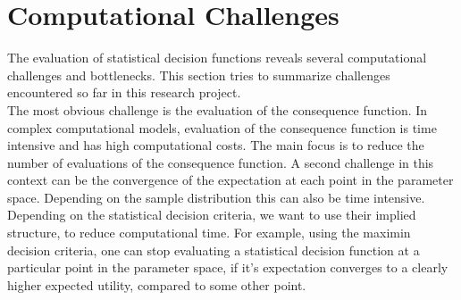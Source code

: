 \section{Computational Challenges}
The evaluation of statistical decision functions reveals several computational challenges and bottlenecks. This section tries to summarize challenges encountered so far in this research project.\\

The most obvious challenge is the evaluation of the consequence function. In complex computational models, evaluation of the consequence function is time intensive and has high computational costs. The main focus is to reduce the number of evaluations of the consequence function. A second challenge in this context can be the convergence of the expectation at each point in the parameter space. Depending on the sample distribution this can also be time intensive.\\

Depending on the statistical decision criteria, we want to use their implied structure, to reduce computational time. For example, using the maximin decision criteria, one can stop evaluating a statistical decision function at a particular point in the parameter space, if it's expectation converges to a clearly higher expected utility, compared to some other point.
